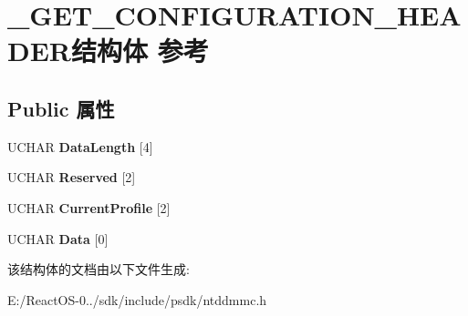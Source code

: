 \hypertarget{struct___g_e_t___c_o_n_f_i_g_u_r_a_t_i_o_n___h_e_a_d_e_r}{}\section{\+\_\+\+G\+E\+T\+\_\+\+C\+O\+N\+F\+I\+G\+U\+R\+A\+T\+I\+O\+N\+\_\+\+H\+E\+A\+D\+E\+R结构体 参考}
\label{struct___g_e_t___c_o_n_f_i_g_u_r_a_t_i_o_n___h_e_a_d_e_r}
\subsection*{Public 属性}
\begin{DoxyCompactItemize}
\item 
\mbox{\label{struct___g_e_t___c_o_n_f_i_g_u_r_a_t_i_o_n___h_e_a_d_e_r_abc70d319747d28c71ddaf4b1fc34003c}} 
U\+C\+H\+AR {\bfseries Data\+Length} \mbox{[}4\mbox{]}
\item 
\mbox{\label{struct___g_e_t___c_o_n_f_i_g_u_r_a_t_i_o_n___h_e_a_d_e_r_a60a11ed539a16963c01bffeca5e9c085}} 
U\+C\+H\+AR {\bfseries Reserved} \mbox{[}2\mbox{]}
\item 
\mbox{\label{struct___g_e_t___c_o_n_f_i_g_u_r_a_t_i_o_n___h_e_a_d_e_r_a6ee3359f402c0f95bfeddaa9a5b92e46}} 
U\+C\+H\+AR {\bfseries Current\+Profile} \mbox{[}2\mbox{]}
\item 
\mbox{\label{struct___g_e_t___c_o_n_f_i_g_u_r_a_t_i_o_n___h_e_a_d_e_r_a6fdf3040be80a645ed17093cca587401}} 
U\+C\+H\+AR {\bfseries Data} \mbox{[}0\mbox{]}
\end{DoxyCompactItemize}


该结构体的文档由以下文件生成\+:\begin{DoxyCompactItemize}
\item 
E\+:/\+React\+O\+S-\/0../sdk/include/psdk/ntddmmc.\+h\end{DoxyCompactItemize}
